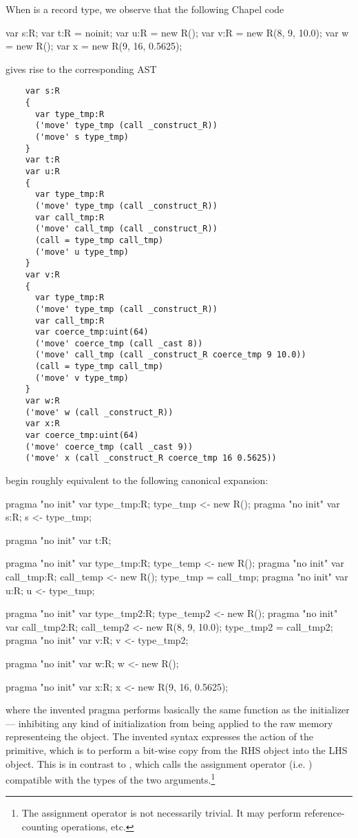 When  is a record type, we observe that the following Chapel code
\begin{chapel}
  var s:R;
  var t:R = noinit;
  var u:R = new R();
  var v:R = new R(8, 9, 10.0);
  var w = new R();
  var x = new R(9, 16, 0.5625);
\end{chapel}
gives rise to the corresponding AST
\begin{verbatim}
    var s:R
    {
      var type_tmp:R
      ('move' type_tmp (call _construct_R))
      ('move' s type_tmp)
    }
    var t:R
    var u:R
    {
      var type_tmp:R
      ('move' type_tmp (call _construct_R))
      var call_tmp:R
      ('move' call_tmp (call _construct_R))
      (call = type_tmp call_tmp)
      ('move' u type_tmp)
    }
    var v:R
    {
      var type_tmp:R
      ('move' type_tmp (call _construct_R))
      var call_tmp:R
      var coerce_tmp:uint(64)
      ('move' coerce_tmp (call _cast 8))
      ('move' call_tmp (call _construct_R coerce_tmp 9 10.0))
      (call = type_tmp call_tmp)
      ('move' v type_tmp)
    }
    var w:R
    ('move' w (call _construct_R))
    var x:R
    var coerce_tmp:uint(64)
    ('move' coerce_tmp (call _cast 9))
    ('move' x (call _construct_R coerce_tmp 16 0.5625))
\end{verbatim}
begin roughly equivalent to the following canonical expansion:
\begin{chapel}
  pragma "no init" var type_tmp:R; type_tmp <- new R();
  pragma "no init" var s:R; s <- type_tmp;

  pragma "no init" var t:R;

  pragma "no init" var type_tmp:R; type_temp <- new R();
  pragma "no init" var call_tmp:R; call_temp <- new R();
  type_tmp = call_tmp;
  pragma "no init" var u:R; u <- type_tmp;

  pragma "no init" var type_tmp2:R; type_temp2 <- new R();
  pragma "no init" var call_tmp2:R; call_temp2 <- new R(8, 9, 10.0);
  type_tmp2 = call_tmp2;
  pragma "no init" var v:R; v <- type_tmp2;

  pragma "no init" var w:R; w <- new R();

  pragma "no init" var x:R; x <- new R(9, 16, 0.5625);
\end{chapel}
\noindent
where the invented pragma  performs basically the same function as the
 initializer --- inhibiting any kind of initialization from being applied
to the raw memory representeing the object.  The invented syntax \chpl{<-} expresses the
action of the  primitive, which is to perform a bit-wise copy from the RHS
object into the LHS object.  This is in contrast to \chpl{=}, which calls the assignment
operator (i.e. ) compatible with the types of the two arguments.\footnote{The
assignment operator is not necessarily trivial.  It may perform reference-counting
operations, etc.}

